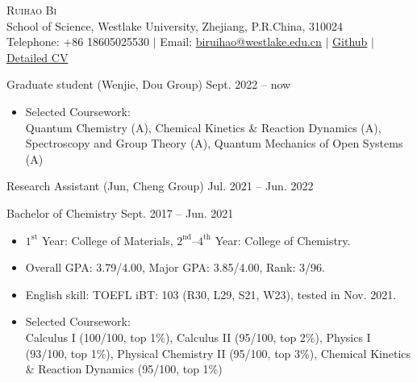 \pagestyle{plain}
\thispagestyle{empty} %
\begin{center}
	\Large{\textsc{Ruihao Bi}} \\
	\normalsize {School of Science, Westlake University, Zhejiang, P.R.China, 310024} \\
	Telephone: {+86 18605025530} $|$
	Email: {\href{mailto:biruihao@westlake.edu.cn}{biruihao@westlake.edu.cn}} $|$
	\href{https://github.com/ruihao69}{Github} $|$ \href{https://github.com/ruihao69/brh-cv}{Detailed CV}  \\
\end{center}

\sectionrule
{}

\noindent Graduate student (Wenjie, Dou Group) \hfill {Sept. 2022 -- now}
\begin{itemize}
	\item Selected Coursework:\\
	      Quantum Chemistry (A), Chemical Kinetics \& Reaction Dynamics (A), Spectroscopy and Group Theory (A), Quantum Mechanics of Open Systems (A)
\end{itemize}


\noindent Research Assistant (Jun, Cheng Group) \hfill {Jul. 2021 -- Jun. 2022}

\noindent Bachelor of Chemistry \hfill {Sept. 2017 -- Jun. 2021}

\begin{itemize}
	\item $\mathrm{1^{st}}$ Year: College of Materials, $\mathrm{2^{nd}}$--$\mathrm{4^{th}}$ Year: College of Chemistry.
	\item Overall GPA: 3.79/4.00, Major GPA: 3.85/4.00, Rank: 3/96.
	\item English skill: TOEFL iBT: 103 (R30, L29, S21, W23), tested in Nov. 2021.
	\item Selected Coursework:\\
	      Calculus I (100/100, top 1\%), Calculus II (95/100, top 2\%), Physics I (93/100, top 1\%), Physical Chemistry II (95/100, top 3\%), Chemical Kinetics \& Reaction Dynamics (95/100, top 1\%)
\end{itemize}

\vspace{5mm}
\sectionrule

